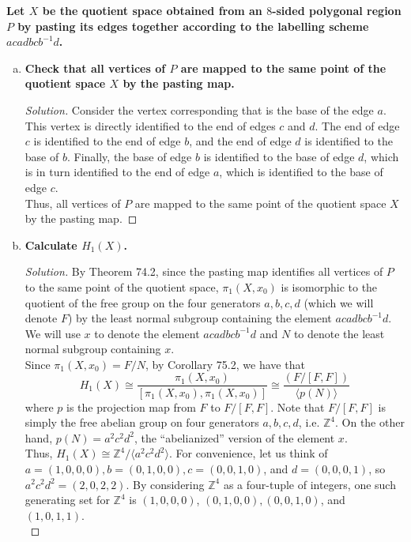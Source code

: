 \documentclass[11pt]{article}
\newcommand{\Z}{\mathbb{Z}}
\newenvironment{solution}
  {\renewcommand\qedsymbol{$\blacksquare$}\begin{proof}[Solution]}
  {\end{proof}}
\begin{document}
\textbf{Let $X$ be the quotient space obtained from an $8$-sided polygonal region $P$ by pasting its edges together according to the labelling scheme $acadbcb^{-1}d$.}

\begin{enumerate}[a)]
    \item \textbf{Check that all vertices of $P$ are mapped to the same point of the quotient space $X$ by the pasting map.}
    
    \begin{solution}
    Consider the vertex corresponding that is the base of the edge $a$. This vertex is directly identified to the end of edges $c$ and $d$.
    The end of edge $c$ is identified to the end of edge $b$, and the end of edge $d$ is identified to the base of $b$. Finally, the 
    base of edge $b$ is identified to the base of edge $d$, which is in turn identified to the end of edge $a$, which is identified to the base of edge $c$. \\
    
    Thus, all vertices of $P$ are mapped to the same point of the quotient space $X$ by the pasting map.
    \end{solution}

    \item \textbf{Calculate $H_1(X)$.}
    
    \begin{solution}
    By Theorem 74.2, since the pasting map identifies all vertices of $P$ to the same point of the quotient space, $\pi_1(X, x_0)$ is isomorphic to the quotient 
    of the free group on the four generators $a, b, c, d$ (which we will denote $F$) by the least normal subgroup containing the element $acadbcb^{-1}d$. We will
    use $x$ to denote the element $acadbcb^{-1}d$ and $N$ to denote the least normal subgroup containing $x$. \\

    Since $\pi_1(X, x_0) = F/N$, by Corollary 75.2, we have that
    \[
        H_1(X) \cong \frac{\pi_1(X, x_0)}{[\pi_1(X, x_0), \pi_1(X, x_0)]} \cong \frac{(F / [F, F])}{ \langle p(N) \rangle}
    \]
    where $p$ is the projection map from $F$ to $F/[F, F]$. Note that $F / [F, F]$ is simply the free abelian group on four generators $a, b, c, d$, i.e. $\Z^4$. On the other hand, $p(N) = a^2c^2d^2$,
    the ``abelianized'' version of the element $x$. \\

    Thus, $H_1(X) \cong \Z^4 / \langle a^2c^2d^2\rangle.$ For convenience, let us think of $a = (1, 0, 0, 0), b = (0, 1, 0, 0), c = (0, 0, 1, 0)$, and $d = (0, 0, 0, 1)$,
    so $a^2c^2d^2 = (2, 0, 2, 2)$. By considering $\Z^4$ as a four-tuple of integers, one such generating set for $\Z^4$ is $(1, 0, 0, 0)$, $(0, 1, 0, 0), (0, 0, 1, 0)$, and $(1, 0, 1, 1)$. \\


\end{solution}
\end{enumerate}
\end{document}
